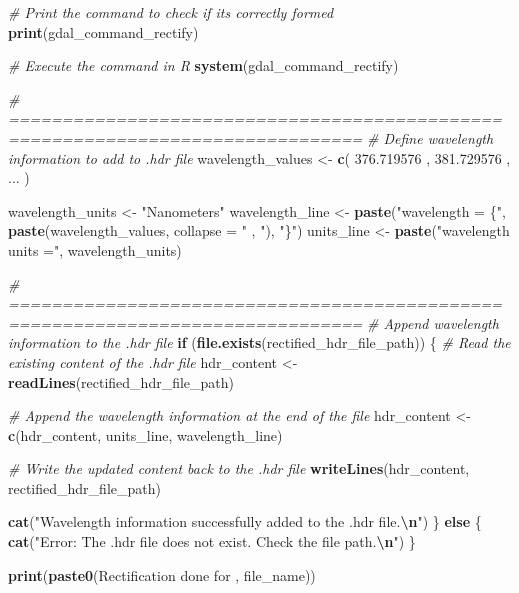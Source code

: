 \documentclass[
]{article}
\newenvironment{Shaded}{\begin{snugshade}}{\end{snugshade}}
\newcommand{\AttributeTok}[1]{\textcolor[rgb]{0.13,0.29,0.53}{#1}}
\newcommand{\CommentTok}[1]{\textcolor[rgb]{0.56,0.35,0.01}{\textit{#1}}}
\newcommand{\ControlFlowTok}[1]{\textcolor[rgb]{0.13,0.29,0.53}{\textbf{#1}}}
\newcommand{\FloatTok}[1]{\textcolor[rgb]{0.00,0.00,0.81}{#1}}
\newcommand{\FunctionTok}[1]{\textcolor[rgb]{0.13,0.29,0.53}{\textbf{#1}}}
\newcommand{\NormalTok}[1]{#1}
\newcommand{\OtherTok}[1]{\textcolor[rgb]{0.56,0.35,0.01}{#1}}
\newcommand{\SpecialCharTok}[1]{\textcolor[rgb]{0.81,0.36,0.00}{\textbf{#1}}}
\newcommand{\StringTok}[1]{\textcolor[rgb]{0.31,0.60,0.02}{#1}}
\begin{document}
\begin{Shaded}
\begin{Highlighting}[]
\CommentTok{\# Print the command to check if it\textquotesingle{}s correctly formed}
\FunctionTok{print}\NormalTok{(gdal\_command\_rectify)}

\CommentTok{\# Execute the command in R}
\FunctionTok{system}\NormalTok{(gdal\_command\_rectify)}

\CommentTok{\# ===============================================================================}
\CommentTok{\# Define wavelength information to add to .hdr file}
\NormalTok{wavelength\_values }\OtherTok{\textless{}{-}} \FunctionTok{c}\NormalTok{(}
  \FloatTok{376.719576}\NormalTok{ ,}
  \FloatTok{381.729576}\NormalTok{ ,}
\NormalTok{  ...}
\NormalTok{)}

\NormalTok{wavelength\_units }\OtherTok{\textless{}{-}} \StringTok{"Nanometers"}
\NormalTok{wavelength\_line }\OtherTok{\textless{}{-}} \FunctionTok{paste}\NormalTok{(}\StringTok{"wavelength = \{"}\NormalTok{, }\FunctionTok{paste}\NormalTok{(wavelength\_values, }\AttributeTok{collapse =} \StringTok{" , "}\NormalTok{), }\StringTok{"\}"}\NormalTok{)}
\NormalTok{units\_line }\OtherTok{\textless{}{-}} \FunctionTok{paste}\NormalTok{(}\StringTok{"wavelength units ="}\NormalTok{, wavelength\_units)}

\CommentTok{\# ===============================================================================}
\CommentTok{\# Append wavelength information to the .hdr file}
\ControlFlowTok{if}\NormalTok{ (}\FunctionTok{file.exists}\NormalTok{(rectified\_hdr\_file\_path)) \{}
  \CommentTok{\# Read the existing content of the .hdr file}
\NormalTok{  hdr\_content }\OtherTok{\textless{}{-}} \FunctionTok{readLines}\NormalTok{(rectified\_hdr\_file\_path)}

  \CommentTok{\# Append the wavelength information at the end of the file}
\NormalTok{  hdr\_content }\OtherTok{\textless{}{-}} \FunctionTok{c}\NormalTok{(hdr\_content, units\_line, wavelength\_line)}

  \CommentTok{\# Write the updated content back to the .hdr file}
  \FunctionTok{writeLines}\NormalTok{(hdr\_content, rectified\_hdr\_file\_path)}

  \FunctionTok{cat}\NormalTok{(}\StringTok{"Wavelength information successfully added to the .hdr file.}\SpecialCharTok{\textbackslash{}n}\StringTok{"}\NormalTok{)}
\NormalTok{\} }\ControlFlowTok{else}\NormalTok{ \{}
  \FunctionTok{cat}\NormalTok{(}\StringTok{"Error: The .hdr file does not exist. Check the file path.}\SpecialCharTok{\textbackslash{}n}\StringTok{"}\NormalTok{)}
\NormalTok{\}}

\FunctionTok{print}\NormalTok{(}\FunctionTok{paste0}\NormalTok{(}\StringTok{\textquotesingle{}Rectification done for \textquotesingle{}}\NormalTok{, file\_name))}
\end{Highlighting}
\end{Shaded}
\end{document}
